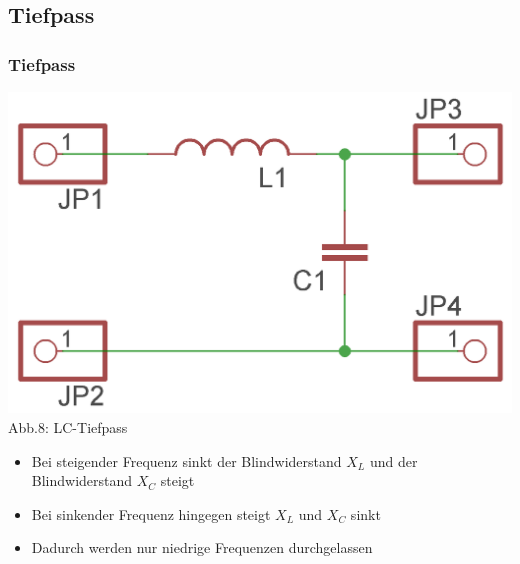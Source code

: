 \subsection*{Tiefpass}
\begin{frame}
\frametitle{Tiefpass}
\begin{center}
	\includegraphics[width=\textwidth,height=.5\textheight,keepaspectratio]{e07/LC-Tiefpass.png}\\
	Abb.8: LC-Tiefpass
\end{center}
\begin{itemize}
	\item Bei steigender Frequenz sinkt der Blindwiderstand $X_L$ und der Blindwiderstand $X_C$ steigt
	\item Bei sinkender Frequenz hingegen steigt $X_L$ und $X_C$ sinkt
	\item Dadurch werden nur niedrige Frequenzen durchgelassen 
\end{itemize}
\end{frame}

